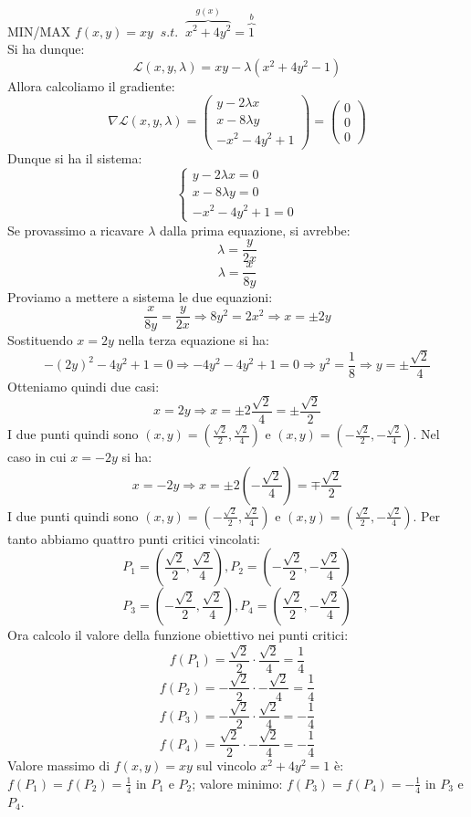 \documentclass[a4paper]{article}
\numberwithin{equation}{subsection}
\begin{document}
{
    MIN/MAX $f(x,y) = xy \; \; s.t. \; \; \overbrace{x^2 + 4y^2}^{g(x)} = \overbrace{1}^{b}$\\
    Si ha dunque:
    \[\mathcal{L}(x,y,\lambda) = xy - \lambda(x^2 + 4y^2 - 1)\]
    Allora calcoliamo il gradiente:
    \[\nabla \mathcal{L}(x,y,\lambda) = \begin{pmatrix}
        y - 2\lambda x\\
        x - 8\lambda y\\
        -x^2 - 4y^2 + 1
    \end{pmatrix} = \begin{pmatrix}
        0\\
        0\\
        0
    \end{pmatrix}\]
    Dunque si ha il sistema:
    \begin{equation*}
        \begin{cases}
            y - 2\lambda x = 0\\
            x - 8\lambda y = 0\\
            -x^2 - 4y^2 + 1 = 0
    \end{cases}
    \end{equation*}
    Se provassimo a ricavare $\lambda$ dalla prima equazione, si avrebbe:
    \[\lambda = \frac{y}{2x}\]
    \[\lambda = \frac{x}{8y}\]
    Proviamo a mettere a sistema le due equazioni:
    \[\frac{x}{8y} = \frac{y}{2x} \Rightarrow 8y^2 = 2x^2 \Rightarrow x = \pm2y\]
    Sostituendo $x = 2y$ nella terza equazione si ha:
    \[-(2y)^2 - 4y^2 + 1 = 0 \Rightarrow -4y^2 - 4y^2 + 1 = 0 \Rightarrow y^2 = \frac{1}{8} \Rightarrow y = \pm\frac{\sqrt{2}}{4}\]
    Otteniamo quindi due casi:
    \[x = 2y \Rightarrow x = \pm 2\frac{\sqrt{2}}{4} = \pm \frac{\sqrt{2}}{2}\]
    I due punti quindi sono $(x,y) = \left(\frac{\sqrt{2}}{2}, \frac{\sqrt{2}}{4}\right)$ e $(x,y) = \left(-\frac{\sqrt{2}}{2}, -\frac{\sqrt{2}}{4}\right)$.
    Nel caso in cui $x = -2y$ si ha:
    \[x = -2y \Rightarrow x = \pm 2\left(-\frac{\sqrt{2}}{4}\right) = \mp \frac{\sqrt{2}}{2}\]
    I due punti quindi sono $(x,y) = \left(-\frac{\sqrt{2}}{2}, \frac{\sqrt{2}}{4}\right)$ e $(x,y) = \left(\frac{\sqrt{2}}{2}, -\frac{\sqrt{2}}{4}\right)$.
    Per tanto abbiamo quattro punti critici vincolati:
    \[P_1 = \left(\frac{\sqrt{2}}{2}, \frac{\sqrt{2}}{4}\right), P_2 = \left(-\frac{\sqrt{2}}{2}, -\frac{\sqrt{2}}{4}\right)\]
    \[P_3 = \left(-\frac{\sqrt{2}}{2}, \frac{\sqrt{2}}{4}\right), P_4 = \left(\frac{\sqrt{2}}{2}, -\frac{\sqrt{2}}{4}\right)\]
    Ora calcolo il valore della funzione obiettivo nei punti critici:
    \[f(P_1) = \frac{\sqrt{2}}{2} \cdot \frac{\sqrt{2}}{4} = \frac{1}{4}\]
    \[f(P_2) = -\frac{\sqrt{2}}{2} \cdot -\frac{\sqrt{2}}{4} = \frac{1}{4}\]
    \[f(P_3) = -\frac{\sqrt{2}}{2} \cdot \frac{\sqrt{2}}{4} = -\frac{1}{4}\]
    \[f(P_4) = \frac{\sqrt{2}}{2} \cdot -\frac{\sqrt{2}}{4} = -\frac{1}{4}\]
    Valore massimo di $f(x,y) = xy$ sul vincolo $x^2 + 4y^2 = 1$ è: $f(P_1) = f(P_2) = \frac{1}{4}$ in $P_1$ e $P_2$; valore minimo: $f(P_3) = f(P_4) = -\frac{1}{4}$ in $P_3$ e $P_4$.
}
\end{document}

